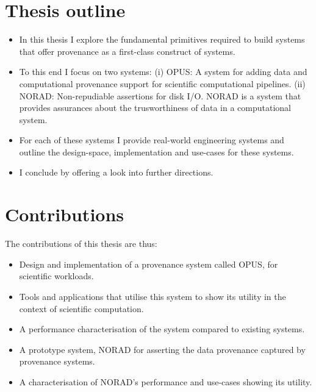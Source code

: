 \documentclass[withindex,glossary]{cam-thesis}
\begin{document}
\section{Thesis outline}
\begin{itemize}
\item In this thesis I explore the fundamental primitives required to build systems that offer provenance as a first-class construct
of systems.
\item To this end I focus on two systems:
(i) OPUS: A system for adding data and computational provenance support for scientific computational pipelines.
(ii) NORAD: Non-repudiable assertions for disk I/O. NORAD is a system that provides assurances about the trusworthiness of data in a computational system.
\item For each of these systems I provide real-world engineering systems and outline the design-space, implementation and use-cases for these systems.
\item I conclude by offering a look into further directions.
\end{itemize}

\section{Contributions}
The contributions of this thesis are thus:
\begin{itemize}
\item Design and implementation of a provenance system called OPUS, for scientific workloads.
\item Tools and applications that utilise this system to show its utility in the context of scientific computation.
\item A performance characterisation of the system compared to existing systems.
\item A prototype system, NORAD for asserting the data provenance captured by provenance systems.
\item A characterisation of NORAD's performance and use-cases showing its utility.
\end{itemize}
\end{document}

